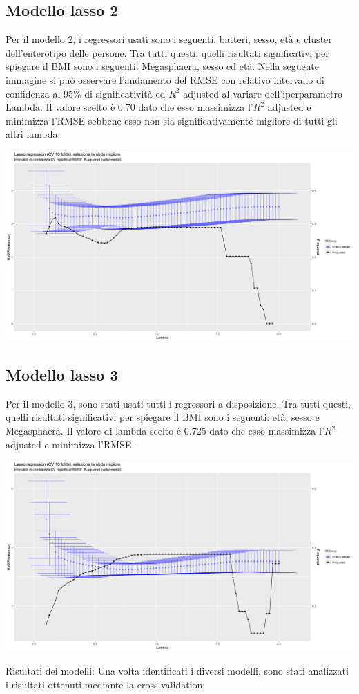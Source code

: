 \subsection{Modello lasso 2}
Per il modello 2, i regressori usati sono i seguenti: batteri, sesso, età e cluster dell’enterotipo delle persone. Tra tutti questi, quelli risultati significativi per spiegare il BMI sono i seguenti: Megasphaera, sesso ed età.
Nella seguente immagine si può osservare l’andamento del RMSE con relativo intervallo di confidenza al 95\% di significatività ed $R^2$ adjusted al variare dell’iperparametro Lambda.
Il valore scelto è 0.70 dato che esso massimizza l’$R^2$ adjusted e minimizza l’RMSE sebbene esso non sia significativamente migliore di tutti gli altri lambda. 

\begin{Figure}
    \centering
    \includegraphics[width=17cm,keepaspectratio]{images/lasso_demo_37taxa_cluster.png}
  \end{Figure}
\subsection{Modello lasso 3}
Per il modello 3, sono stati usati tutti i regressori a disposizione.
Tra tutti questi, quelli risultati significativi per spiegare il BMI sono i seguenti: età, sesso e Megasphaera. Il valore di lambda scelto è 0.725 dato che esso massimizza l’$R^2$ adjusted e minimizza l’RMSE. 

\begin{Figure}
    \centering
    \includegraphics[width=17cm,keepaspectratio]{images/lasso_demo_37taxa_nutriens_cluster.png}
  \end{Figure}
Risultati dei modelli: 
Una volta identificati i diversi modelli, sono stati analizzati i risultati ottenuti mediante la cross-validation: 

